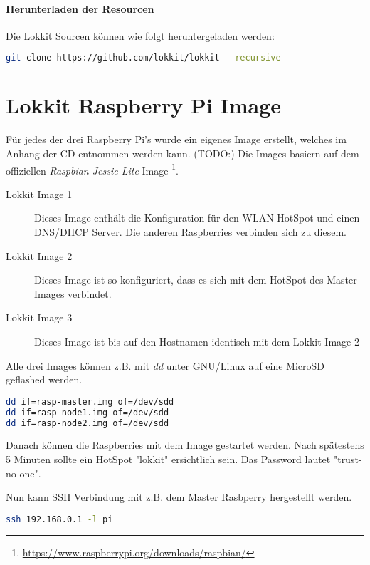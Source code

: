 \paragraph{Herunterladen der Resourcen}

Die Lokkit Sourcen können wie folgt heruntergeladen werden:

\begin{lstlisting}[language=bash]
git clone https://github.com/lokkit/lokkit --recursive
\end{lstlisting}

\section{Lokkit Raspberry Pi Image}
Für jedes der drei Raspberry Pi's wurde ein eigenes Image erstellt, welches im Anhang der CD entnommen werden kann. (TODO:) Die Images basiern auf dem offiziellen \emph{Raspbian Jessie Lite} Image \footnote{\url{https://www.raspberrypi.org/downloads/raspbian/}}.

\begin{description}
    \item[Lokkit Image 1] Dieses Image enthält die Konfiguration für den WLAN HotSpot und einen DNS/DHCP Server. Die anderen Raspberries verbinden sich zu diesem.
    \item[Lokkit Image 2] Dieses Image ist so konfiguriert, dass es sich mit dem HotSpot des Master Images verbindet.
    \item[Lokkit Image 3] Dieses Image ist bis auf den Hostnamen identisch mit dem Lokkit Image 2
\end{description}

Alle drei Images können z.B. mit \emph{dd} unter GNU/Linux auf eine MicroSD geflashed werden.

\begin{lstlisting}[language=bash]
dd if=rasp-master.img of=/dev/sdd
dd if=rasp-node1.img of=/dev/sdd
dd if=rasp-node2.img of=/dev/sdd
\end{lstlisting}

Danach können die Raspberries mit dem Image gestartet werden. Nach spätestens 5 Minuten sollte ein HotSpot "lokkit" ersichtlich sein. Das Password lautet "trust-no-one".

Nun kann SSH Verbindung mit z.B. dem Master Rasbperry hergestellt werden.

\begin{lstlisting}[language=bash]
ssh 192.168.0.1 -l pi

\end{lstlisting}

